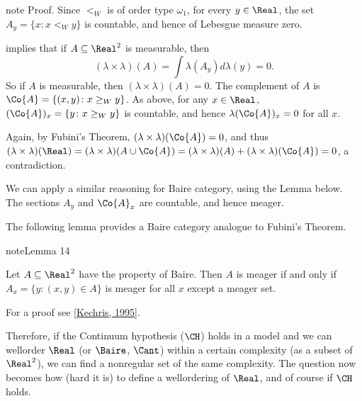 \documentclass[letterpaper,10pt,english]{jupyterBook}
\begin{document}
\begin{sphinxadmonition}{note}
\sphinxAtStartPar
Proof. Since \(<_W\) is of order type \(\omega_1\), for every \(y \in \Real\), the set \(A_y = \{x \colon x <_W y \}\) is countable, and hence of Lebesgue measure zero.

\sphinxAtStartPar
{} implies that if \(A \subseteq \Real^2\) is measurable, then
\begin{equation*}
	(\lambda\times\lambda) (A) = \int \lambda(A_y) d\lambda(y) = 0.
\end{equation*}
\sphinxAtStartPar
So if \(A\) is measurable, then \((\lambda\times\lambda) (A) = 0\). The complement of \(A\) is \( \Co{A} = \{(x,y) \colon x \geq_W y \}\). As above, for any \(x \in \Real\), \((\Co{A})_x = \{y \colon x \geq_W y \}\) is countable, and hence \(\lambda(\Co{A})_x = 0\) for all \(x\).

\sphinxAtStartPar
Again, by Fubini’s Theorem, \((\lambda\times\lambda) (\Co{A}) = 0\), and thus \((\lambda\times\lambda) (\Real)  = (\lambda\times\lambda) (A \cup \Co{A}) = (\lambda\times\lambda) (A) + (\lambda\times\lambda) (\Co{A}) = 0\), a contradiction.

\sphinxAtStartPar
We can apply a similar reasoning for Baire category, using the Lemma below. The sections \(A_y\) and \(\Co{A}_x\) are countable, and hence meager.
\end{sphinxadmonition}

\sphinxAtStartPar
The following lemma provides a Baire category analogue to Fubini’s Theorem.
\label{projective:lem-Fubini-category}
\begin{sphinxadmonition}{note}{Lemma 14}



\sphinxAtStartPar
Let \(A \subseteq \Real^2\) have the property of Baire. Then \(A\) is meager if and only if \(A_x = \{y \colon (x,y) \in A\}\) is meager for all \(x\) except a meager set.
\end{sphinxadmonition}

\sphinxAtStartPar
For a proof see {[}\hyperlink{cite.bibliography:id10}{Kechris, 1995}{]}.

\sphinxAtStartPar
Therefore, if the Continuum hypothesis (\(\CH\)) holds in a model and we can well\sphinxhyphen{}order \(\Real\) (or \(\Baire\), \(\Cant\)) within a certain complexity (as a subset of \(\Real^2\)), we can find a non\sphinxhyphen{}regular set of the same complexity. The question now becomes how (hard it is) to define a well\sphinxhyphen{}ordering of \(\Real\), and of course if \(\CH\) holds.
\end{document}
